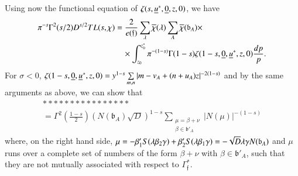 Using now the functional equation of
$\zeta(s,\underline{u}^{\ast},\underline{0},z,0)$, we have
\begin{align*}
\pi^{-s}\Gamma^{2}(s/2)D^{s/2}TL(s,\chi) &=
\frac{2}{e(\mathfrak{f})}\sum_{\lambda}\overline{\chi}(\lambda)\sum_{A}\overline{\chi}(\mathfrak{b}_{A})\times\\
&\quad \times
\int^{z^{\ast}_{0}}_{z_{0}}\pi^{-(1-s)}\Gamma(1-s)\zeta(1-s,\underline{0},\underline{u}^{\ast},z,0)\frac{dp}{p}. 
\end{align*}
For $\sigma<0$,
$\zeta(1-s,\underline{0},\underline{u}^{\ast},z,0)=y^{1-s}\sum\limits_{m,n}|m-v_{A}+(n+u_{A})z|^{-2(1-s)}$
and by the same arguments as above, we can show that
\begin{gather*}
****************\\
=\Gamma^{2}\left(\frac{1-s}{2}\right)(N(\mathfrak{b}_{A})\sqrt{D})^{1-s}\sum_{\substack{\mu=\beta+\nu\\ \beta\in
\mathfrak{b}'_{A}}}|N(\mu)|^{-(1-s)}
\end{gather*}
where, on the right hand side,
$\mu=-\beta'_{1}S(\lambda\beta_{2}\gamma)+\beta'_{2}S(\lambda\beta_{1}\gamma)=\break-\sqrt{D}\lambda\gamma
N(\mathfrak{b}_{A})$ and $\mu$ runs over a complete set of numbers of
the form $\beta+\nu$ with $\beta\in \mathfrak{b}'_{A}$, such that they
are not mutually associated with respect to $\Gamma^{\ast}_{\mathfrak{f}}$. 

